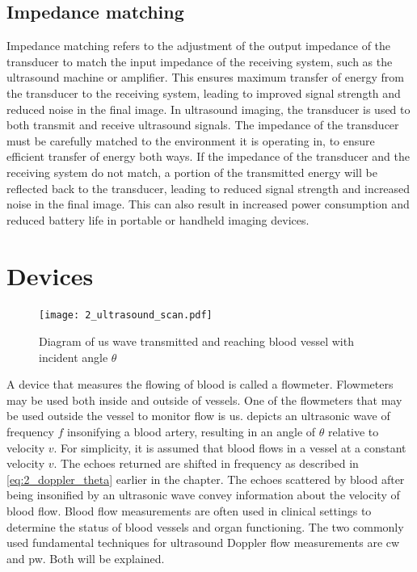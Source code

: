 \subsection{Impedance matching}
Impedance matching refers to the adjustment of the output impedance of the transducer to match the input impedance of the receiving system, such as the ultrasound machine or amplifier. This ensures maximum transfer of energy from the transducer to the receiving system, leading to improved signal strength and reduced noise in the final image. In ultrasound imaging, the transducer is used to both transmit and receive ultrasound signals. The impedance of the transducer must be carefully matched to the environment it is operating in, to ensure efficient transfer of energy both ways. If the impedance of the transducer and the receiving system do not match, a portion of the transmitted energy will be reflected back to the transducer, leading to reduced signal strength and increased noise in the final image. This can also result in increased power consumption and reduced battery life in portable or handheld imaging devices.

\section{Devices}
\begin{figure}[htbp]
	\centering
	\texttt{[image: 2\_ultrasound\_scan.pdf]}
	\caption[Diagram of ultrasound wave transmitted and reaching blood vessel with incident angle $\theta$]{Diagram of \gls{us} wave transmitted and reaching blood vessel with incident angle $\theta$ \cite{ShungUltrasound_Book}}
	\label{fig:2_ultrasound_flow_scan}
\end{figure}

A device that measures the flowing of blood is called a flowmeter. Flowmeters may be used both inside and outside of vessels. One of the flowmeters that may be used outside the vessel to monitor flow is \gls{us}.  depicts an ultrasonic wave of frequency $f$ insonifying a blood artery, resulting in an angle of $\theta$ relative to velocity $v$. For simplicity, it is assumed that blood flows in a vessel at a constant velocity $v$. The echoes returned are shifted in frequency as described in \cref{eq:2_doppler_theta} earlier in the chapter. The echoes scattered by blood after being insonified by an ultrasonic wave convey information about the velocity of blood flow. Blood flow measurements are often used in clinical settings to determine the status of blood vessels and organ functioning. The two commonly used fundamental techniques for ultrasound Doppler flow measurements are \gls{cw} and \gls{pw}. Both will be explained.

